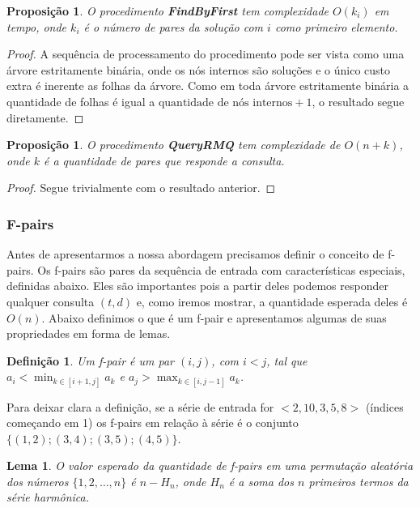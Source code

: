 \documentclass[12pt]{article}
\newtheorem{lem}[thm]{Lema}
\newtheorem{prop}[thm]{Proposição}
\newtheorem{defi}[thm]{Definição}
\begin{document}
\begin{prop}
O procedimento {\bf FindByFirst} tem complexidade $O(k_i)$ em tempo,
onde $k_i$ é o número de pares da solução com $i$ como primeiro elemento.
\end{prop}  
\begin{proof}
A sequência de processamento do procedimento pode ser vista
como uma árvore estritamente binária, onde os nós internos são soluções e o único
custo extra é inerente as folhas da árvore. Como em toda
árvore estritamente binária a quantidade de folhas é igual a $\text{quantidade de nós internos} + 1$,
o resultado segue diretamente.
\end{proof} 

\begin{prop}
O procedimento {\bf QueryRMQ} tem complexidade de $O(n + k)$,
onde $k$ é a quantidade de pares que responde a consulta.
\end{prop}

\begin{proof}
Segue trivialmente com o resultado anterior.
\end{proof} 

\subsubsection{F-pairs}

Antes de apresentarmos a nossa abordagem precisamos definir 
o conceito de f-pairs. Os f-pairs são pares da sequência de entrada
com características especiais, definidas abaixo. Eles são importantes pois
a partir deles podemos responder qualquer consulta $(t, d)$ e,
como iremos mostrar, a quantidade esperada deles é $O(n)$. 
Abaixo definimos o que é um f-pair e apresentamos algumas de suas propriedades
em forma de lemas.

\begin{defi}
Um f-pair é um par $(i, j)$, com $i < j$, tal que $a_i < \min_{k \in [i + 1, j]} a_k$ e $a_j > \max_{k \in [i, j -1]} a_k$.
\end{defi}
Para deixar clara a definição, se a série de entrada for $<2, 10, 3, 5, 8>$ (índices começando em 1) os f-pairs
em relação à série é o conjunto $\{(1, 2); (3, 4); (3, 5); (4, 5) \}$. 

\begin{lem}
O valor esperado da quantidade de f-pairs em uma
permutação aleatória dos números $\{1, 2, \ldots, n\}$ é $n - H_n$, onde
$H_n$ é a soma dos $n$ primeiros termos da série harmônica.
\label{amountf}
\end{lem}
\end{document}
